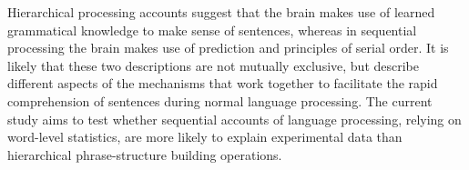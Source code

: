 \documentclass[a4paper,10pt,twoside]{article}
\begin{document}


Hierarchical processing accounts suggest that the brain makes use of
learned grammatical knowledge to make sense of sentences, whereas in
sequential processing the brain makes use of prediction and principles
of serial order. It is likely that these two descriptions are not
mutually exclusive, but describe different aspects of the mechanisms
that work together to facilitate the rapid comprehension of sentences
during normal language processing. The current study aims to test
whether sequential accounts of language processing, relying on
word-level statistics, are more likely to explain experimental data
than hierarchical phrase-structure building operations. 
\end{document}
